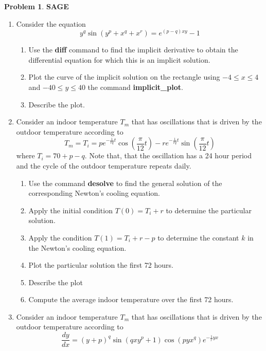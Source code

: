 \documentclass[10pt]{article}
\theoremstyle{definition}
\newtheorem{problem}{Problem}
\begin{document}
\newpage
\begin{problem}
\textbf{SAGE}
\begin{enumerate}[label=(\alph*)]
  \item Consider the equation
        $$y^q\sin\left(y^p+x^q+x^r\right)=e^{\left(p-q\right)xy}-1$$
        \begin{enumerate}[label=\roman*.]
          \item Use the \textbf{diff} command to find the implicit derivative to obtain the differential equation for
                which this is an implicit solution.
                
          \item Plot the curve of the implicit solution on the rectangle using $-4 \leq x \leq 4$ and $-40 \leq y \leq 40$
                the command \textbf{implicit\_plot}.
          \item Describe the plot.
        \end{enumerate}
  \item Consider an indoor temperature $T_m$ that has oscillations that is driven by the outdoor temperature according to
        $$T_m=T_i=pe^{-\frac{1}{rq}t}\cos\left(\frac{\pi}{12}t\right)-re^{-\frac{1}{rq}t}\sin\left(\frac{\pi}{12}t\right)$$
        where $T_i = 70 + p-q$. Note that, that the oscillation has a 24 hour period and the cycle of the
        outdoor temperature repeats daily.
        \begin{enumerate}[label=\roman*.]
          \item Use the command \textbf{desolve} to find the general solution of the corresponding Newton's cooling
                equation.
          \item Apply the initial condition $T(0) = T_i + r$ to determine the particular solution.
          \item Apply the condition $T(1) = T_i + r-p$ to determine the constant $k$ in the Newton's cooling
                equation.
          \item Plot the particular solution the first 72 hours.
          \item Describe the plot
          \item Compute the average indoor temperature over the first 72 hours.
        \end{enumerate}
  \item Consider an indoor temperature $T_m$ that has oscillations that is driven by the outdoor temperature according to
        $$\frac{dy}{dx}=(y+p)^q\sin\left(qxy^p+1\right)\cos\left(pyx^q\right)e^{-\frac{1}{r}yx}$$

\end{enumerate}
\end{problem}
\end{document}
